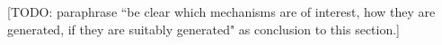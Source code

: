 \documentclass[bimj,fleqn]{w-art}
\begin{document}
[TODO: paraphrase ``be clear which mechanisms are of interest, how they are generated, if they are suitably generated" as conclusion to this section.]
\end{document}

